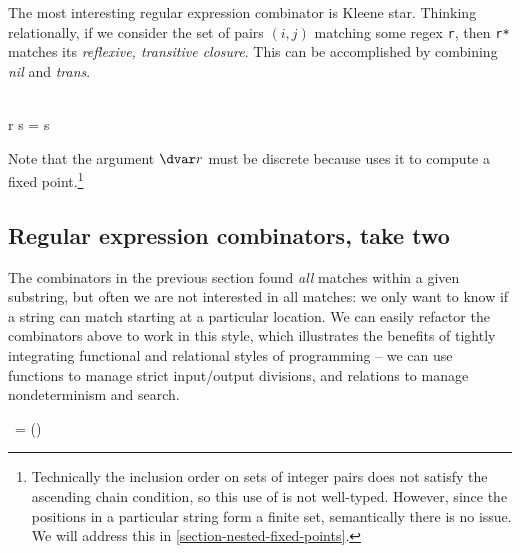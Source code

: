 \noindent
The most interesting regular expression combinator is Kleene star. Thinking
relationally, if we consider the set of pairs $(i,j)$ matching some regex
\texttt{r}, then \texttt{r*} matches its \emph{reflexive, transitive closure}.
This can be accomplished by combining \emph{nil} and \emph{trans}.

\nopagebreak[2]
\begin{code}
   \isa \iso\tre \to \tre\\
   \<\pboxvar r \<\pboxvar s =
  \<\eboxvar s \vee
   \<
\end{code}

\noindent
Note that the argument $\dvar r$ must be discrete because  uses it
to compute a fixed point.\footnote{Technically the inclusion order on sets of
  integer pairs does not satisfy the ascending chain condition, so this use
  of  is not well-typed. However, since the positions in a
  particular string form a finite set, semantically there is no issue.
  We will address this in \cref{section-nested-fixed-points}.}



\subsection{Regular expression combinators, take two}
\label{regex-combinators-take-two}

\newcommand\kernj{\kern1pt j}
\renewcommand\kernj{j}



The combinators in the previous section found \emph{all} matches
within a given substring, but often we are not interested in all
matches: we only want to know if a string can match starting at a
particular location. We can easily refactor the combinators above to
work in this style, which illustrates the benefits of tightly
integrating functional and relational styles of programming -- we can
use functions to manage strict input/output divisions, and relations
to manage nondeterminism and search.

\begin{code}
  \ \tre = \iso (\tstring \x \tint) \to \tset{\tint}
\end{code}

